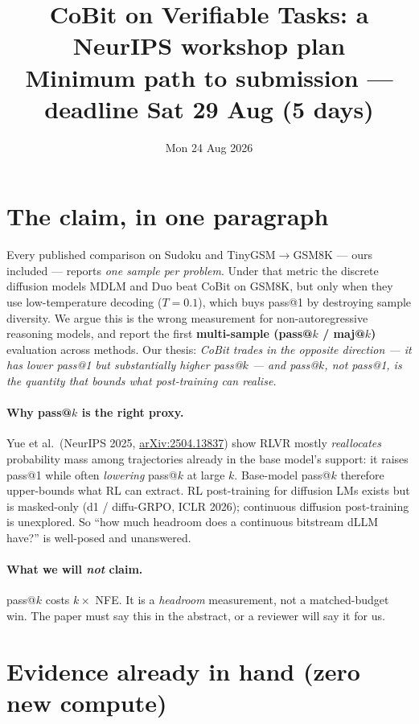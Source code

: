 \documentclass[11pt,a4paper]{article}
\title{\vspace{-1.5cm}\textbf{CoBit on Verifiable Tasks: a NeurIPS workshop plan}\\
\large Minimum path to submission --- deadline Sat 29 Aug (5 days)}
\author{}
\date{Mon 24 Aug 2026}
\begin{document}
\maketitle\vspace{-1cm}

\section{The claim, in one paragraph}

Every published comparison on Sudoku and TinyGSM$\to$GSM8K --- ours included --- reports
\emph{one sample per problem}. Under that metric the discrete diffusion models MDLM and Duo
beat CoBit on GSM8K, but only when they use low-temperature decoding ($T{=}0.1$), which buys
pass@1 by destroying sample diversity. We argue this is the wrong measurement for
non-autoregressive reasoning models, and report the first \textbf{multi-sample (pass@$k$ /
maj@$k$)} evaluation across methods. Our thesis: \emph{CoBit trades in the opposite direction
--- it has lower pass@1 but substantially higher pass@$k$ --- and pass@$k$, not pass@1, is the
quantity that bounds what post-training can realise.}

\paragraph{Why pass@$k$ is the right proxy.} Yue et al.\ (NeurIPS 2025,
\href{https://arxiv.org/pdf/2504.13837}{arXiv:2504.13837}) show RLVR mostly \emph{reallocates}
probability mass among trajectories already in the base model's support: it raises pass@1 while
often \emph{lowering} pass@$k$ at large $k$. Base-model pass@$k$ therefore upper-bounds what RL
can extract. RL post-training for diffusion LMs exists but is masked-only
(d1 / diffu-GRPO, ICLR 2026); continuous diffusion post-training is unexplored. So
``how much headroom does a continuous bitstream dLLM have?'' is well-posed and unanswered.

\paragraph{What we will \emph{not} claim.} pass@$k$ costs $k\times$ NFE. It is a
\emph{headroom} measurement, not a matched-budget win. The paper must say this in the abstract,
or a reviewer will say it for us.

\section{Evidence already in hand (zero new compute)}
\end{document}
